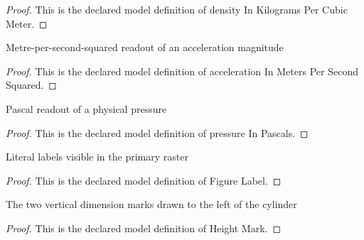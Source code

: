 \begin{proof}
  This is the declared model definition of density In Kilograms Per Cubic Meter.
\end{proof}
\begin{definition}
  \label{def:physics:phyx-mini-0665:phyxminiproblems-problemphyxmini0665-accelerationinmeterspersecondsquared}
  Metre-per-second-squared readout of an acceleration magnitude
\end{definition}
\begin{proof}
  This is the declared model definition of acceleration In Meters Per Second Squared.
\end{proof}
\begin{definition}
  \label{def:physics:phyx-mini-0665:phyxminiproblems-problemphyxmini0665-pressureinpascals}
  Pascal readout of a physical pressure
\end{definition}
\begin{proof}
  This is the declared model definition of pressure In Pascals.
\end{proof}
\begin{definition}
  \label{def:physics:phyx-mini-0665:phyxminiproblems-problemphyxmini0665-figurelabel}
  Literal labels visible in the primary raster
\end{definition}
\begin{proof}
  This is the declared model definition of Figure Label.
\end{proof}
\begin{definition}
  \label{def:physics:phyx-mini-0665:phyxminiproblems-problemphyxmini0665-heightmark}
  The two vertical dimension marks drawn to the left of the cylinder
\end{definition}
\begin{proof}
  This is the declared model definition of Height Mark.
\end{proof}
